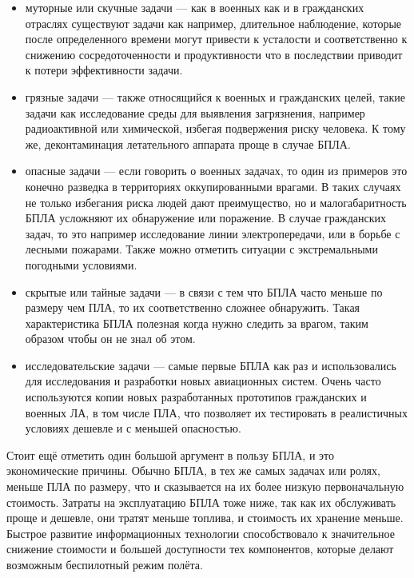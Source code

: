 \documentclass[specification,annotation]{itmo-student-thesis}
\begin{document}
\begin{itemize}
  \item муторные или скучные задачи --- как в военных как и в гражданских
    отраслях существуют задачи как например, длительное наблюдение, которые
    после определенного времени могут привести к усталости и соответственно к
    снижению сосредоточенности и продуктивности что в последствии приводит к
    потери эффективности задачи.
  \item грязные задачи --- также относящийся к военных и гражданских целей, такие
    задачи как исследование среды для выявления загрязнения, например
    радиоактивной или химической, избегая подвержения риску человека. К тому же,
    деконтаминация летательного аппарата проще в случае БПЛА.
  \item опасные задачи --- если говорить о военных задачах, то один из примеров
    это конечно разведка в территориях оккупированными врагами. В таких случаях
    не только избегания риска людей дают преимущество, но и малогабаритность
    БПЛА усложняют их обнаружение или поражение. В случае гражданских задач, то
    это например исследование линии электропередачи, или в борьбе с лесными
    пожарами. Также можно отметить ситуации с экстремальными погодными
    условиями.
  \item скрытые или тайные задачи --- в связи с тем что БПЛА часто меньше по
    размеру чем ПЛА, то их соответственно сложнее обнаружить. Такая
    характеристика БПЛА полезная когда нужно следить за врагом, таким образом
    чтобы он не знал об этом.
  \item исследовательские задачи --- самые первые БПЛА как раз и использовались
    для исследования и разработки новых авиационных систем. Очень часто
    используются копии новых разработанных прототипов гражданских и военных ЛА,
    в том числе ПЛА, что позволяет их тестировать в реалистичных условиях
    дешевле и с меньшей опасностью.
\end{itemize}

Стоит ещё отметить один большой аргумент в пользу БПЛА, и это экономические
причины. Обычно БПЛА, в тех же самых задачах или ролях, меньше ПЛА по размеру,
что и сказывается на их более низкую первоначальную стоимость. Затраты на
эксплуатацию БПЛА тоже ниже, так как их обслуживать проще и дешевле, они тратят
меньше топлива, и стоимость их хранение меньше. Быстрое развитие информационных
технологии способствовало к значительное снижение стоимости и большей
доступности тех компонентов, которые делают возможным беспилотный режим полёта.
\end{document}
